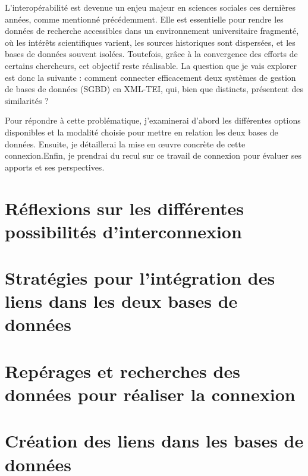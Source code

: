 \documentclass[a4paper,12pt,twoside]{book} %
\begin{document}
L'interopérabilité est devenue un enjeu majeur en sciences sociales ces dernières années, comme mentionné précédemment. Elle est essentielle pour rendre les données de recherche accessibles dans un environnement universitaire fragmenté, où les intérêts scientifiques varient, les sources historiques sont dispersées, et les bases de données souvent isolées. Toutefois, grâce à la convergence des efforts de certains chercheurs, cet objectif reste réalisable. La question que je vais explorer est donc la suivante : comment connecter efficacement deux systèmes de gestion de bases de données (SGBD) en XML-TEI, qui, bien que distincts, présentent des similarités ?

Pour répondre à cette problématique, j'examinerai d'abord les différentes options disponibles et la modalité choisie pour mettre en relation les deux bases de données. Ensuite, je détaillerai la mise en œuvre concrète de cette connexion.Enfin, je prendrai du recul sur ce travail de connexion pour évaluer ses apports et ses perspectives.


\newpage{\pagestyle{empty}\cleardoublepage}

	\mainmatter

\chapter{Réflexions sur les différentes possibilités d'interconnexion}

\chapter{Stratégies pour l'intégration des liens dans les deux bases de données}


\chapter{Repérages et recherches des données pour réaliser la connexion}

\chapter{Création des liens dans les bases de données}	%

	
\end{document}
